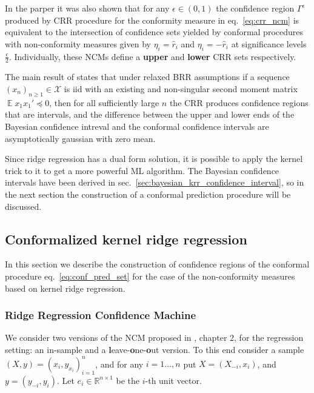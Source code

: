 \documentclass{ITaSconf}
\newcommand{\ex}{\mathop{\mathbb{E}}\nolimits}
\newcommand{\Xcal}{\mathcal{X}}
\newcommand{\Real}{\mathbb{R}}
\begin{document}
In the parper it was also shown that for any $\epsilon\in(0,1)$ the confidence
region $\Gamma^\epsilon$ produced by CRR procedure for the conformity measure in
eq.~\ref{eq:crr_ncm} is equivalent to the intersection of confidence sets yielded
by conformal procedures with non-conformity measures given by $\eta_i = \hat{r}_i$
and $\eta_i = -\hat{r}_i$ at significance levels $\frac{\epsilon}{2}$. Individually,
these NCMs define a \textbf{upper} and \textbf{lower} CRR sets respectively.

The main result of \cite{BurVovk2014} states that under relaxed BRR assumptions if
a sequence $(x_n)_{n\geq1}\in\Xcal$ is iid with an existing and non-singular second
moment matrix $\ex x_1x_1' \preceq 0$, then for all sufficiently large $n$ the CRR
produces confidence regions that are intervals, and the difference between the upper
and lower ends of the Bayesian confidence intreval and the conformal confidence
intervals are asymptotically gaussian with zero mean.

Since ridge regression has a dual form solution, it is possible to apply the kernel
trick to it to get a more powerful ML algorithm. The Bayesian confidence intervals
have been derived in sec.~\ref{sec:bayesian_krr_confidence_interval}, so in the next
section the construction of a conformal prediction procedure will be discussed.


\subsection{Conformalized kernel ridge regression} %
\label{sub:conformalized_krr}

In this section we describe the construction of confidence regions of the conformal
procedure eq.~\ref{eq:conf_pred_set} for the case of the non-conformity measures
based on kernel ridge regression.

\subsubsection{Ridge Regression Confidence Machine} %
\label{ssub:ridge_regression_confidence_machine}

We consider two versions of the NCM proposed in \cite{vovk2005}, chapter 2,
for the regression setting: an in-sample and a \textbf{l}eave-\textbf{o}ne-\textbf{o}ut
version. To this end consider a sample $(X, y) = (x_i, y_{x_i})_{i=1}^n$, and for
any $i=1\ldots, n$ put $X = (X_{-i}, x_i)$, and $y = (y_{-i}, y_i)$.
Let $e_i\in \Real^{n\times 1}$ be the $i$-th unit vector.
\end{document}
